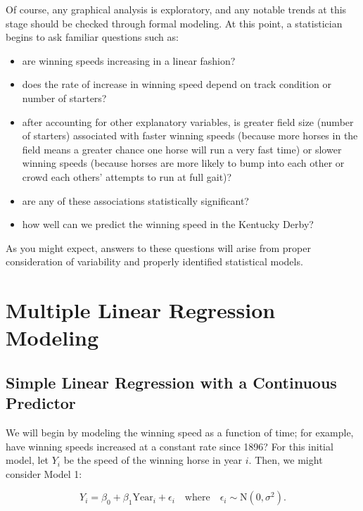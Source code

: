 \documentclass[
]{krantz}
\providecommand{\tightlist}{%
  \setlength{\itemsep}{0pt}\setlength{\parskip}{0pt}}
\begin{document}
Of course, any graphical analysis is exploratory, and any notable trends at this stage should be checked through formal modeling. At this point, a statistician begins to ask familiar questions such as:

\begin{itemize}
\tightlist
\item
  are winning speeds increasing in a linear fashion?
\item
  does the rate of increase in winning speed depend on track condition or number of starters?
\item
  after accounting for other explanatory variables, is greater field size (number of starters) associated with faster winning speeds (because more horses in the field means a greater chance one horse will run a very fast time) or slower winning speeds (because horses are more likely to bump into each other or crowd each others' attempts to run at full gait)?
\item
  are any of these associations statistically significant?
\item
  how well can we predict the winning speed in the Kentucky Derby?
\end{itemize}

As you might expect, answers to these questions will arise from proper consideration of variability and properly identified statistical models.

\hypertarget{multreg}{%
\section{Multiple Linear Regression Modeling}\label{multreg}}

\hypertarget{SLRcontinuous}{%
\subsection{Simple Linear Regression with a Continuous Predictor}\label{SLRcontinuous}}

We will begin by modeling the winning speed as a function of time; for example, have winning speeds increased at a constant rate since 1896? For this initial model, let \(Y_{i}\) be the speed of the winning horse in year \(i\). Then, we might consider Model 1:

\begin{equation}
 Y_{i}=\beta_{0}+\beta_{1}\textrm{Year}_{i}+\epsilon_{i} \quad \textrm{where} \quad \epsilon_{i}\sim \textrm{N}(0,\sigma^2).
\label{eq:model1}
\end{equation}
\end{document}
